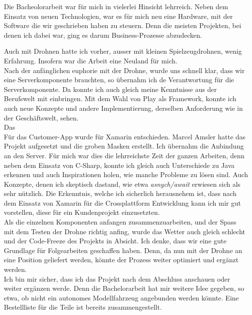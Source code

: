 Die Bacheolorarbeit war für mich in vielerlei Hinsicht lehrreich. 
Neben dem Einsatz von neuen Technologien, war es für mich neu eine Hardware, mit der Software die wir geschrieben haben zu steuern.
Denn die meisten Projekten, bei denen ich dabei war, ging es darum Business-Prozesse abzudecken.

Auch mit Drohnen hatte ich vorher, ausser mit kleinen Spielzeugdrohnen, wenig Erfahrung. Insofern war die Arbeit eine Neuland für mich.
\\

Nach der anfänglichen euphorie mit der Drohne, wurde uns schnell klar, dass wir eine Serverkomponente brauchten, so übernahm ich de Verantwortung für die Serverkomponente. 
Da konnte ich auch gleich meine Kenntnisse aus der Berufswelt mit einbringen. 
Mit dem Wahl von Play als Framework, konnte ich auch neue Konzepte und andere Implementierung, derselben Anforderung wie in der Geschäftswelt, sehen. 
\\

Das 
\\

Für das Customer-App wurde für Xamarin entschieden.
Marcel Amsler hatte das Projekt aufgesetzt und die groben Masken erstellt. Ich übernahm die Anbindung an den Server.
Für mich war dies die lehrreichste Zeit der ganzen Arbeiten, denn neben dem Einsatz von C-Sharp, konnte ich gleich auch Unterschiede zu Java erkennen und auch Inspirationen holen, wie manche Probleme zu lösen sind. Auch Konzepte, denen ich skeptisch dastand, wie etwa \textit{asnych/await} erwiesen sich als sehr nützlich. Die Erkenntnis, welche ich sicherlich herausnehem ist, dass nach dem Einsatz von Xamarin für die Crossplattform Entwicklung kann ich mir gut vorstellen, diese für ein Kundenprojekt einzusetzten. 
\\

Als die einzelnen Komponenten anfangen zusammenzuarbeiten, und der Spass mit dem Testen der Drohne richtig anfing, wurde das Wetter auch gleich schlecht und der Code-Freeze des Projekts in Absicht. Ich denke, dass wir eine gute Grundlage für Folgearbeiten geschaffen haben. Denn, da nun mit der Drohne an eine Position geliefert werden, könnte der Prozess weiter optimiert und ergänzt werden. \\

Ich bin mir sicher, dass ich das Projekt nach dem Abschluss anschauen oder weiter ergänzen werde. Denn die Bachelorarbeit hat mir weitere Idee gegeben, so etwa, ob nicht ein autonomes Modellfahrzeug angebunden werden könnte. Eine Bestellliste für die Teile ist bereits zusammengestellt.











